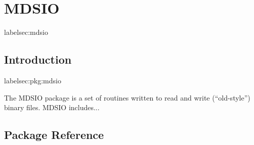 

\section{MDSIO}
label{sec:mdsio}

\subsection{Introduction}
label{sec:pkg:mdsio}

The MDSIO package is a set of routines written to read and write
(``old-style'') binary files.  MDSIO includes...


\subsection{Package Reference}

